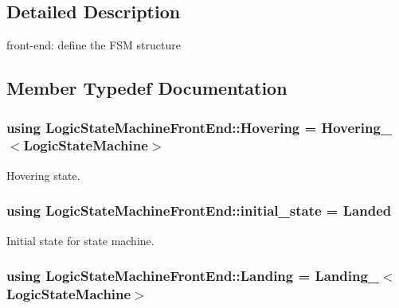 \subsection{Detailed Description}
front-\/end\-: define the F\-S\-M structure 

\subsection{Member Typedef Documentation}
\hypertarget{classLogicStateMachineFrontEnd_a5877b5b19ba413c2b3bb02ee2459d5ec}{
\subsubsection[{Hovering}]{\setlength{\rightskip}{0pt plus 5cm}using {\bf Logic\-State\-Machine\-Front\-End\-::\-Hovering} =  {\bf Hovering\-\_\-}$<${\bf Logic\-State\-Machine}$>$}}\label{classLogicStateMachineFrontEnd_a5877b5b19ba413c2b3bb02ee2459d5ec}


Hovering state. 

\hypertarget{classLogicStateMachineFrontEnd_ae617089cdb6687edc5d27b7f8a546af2}{
\subsubsection[{initial\-\_\-state}]{\setlength{\rightskip}{0pt plus 5cm}using {\bf Logic\-State\-Machine\-Front\-End\-::initial\-\_\-state} =  {\bf Landed}}}\label{classLogicStateMachineFrontEnd_ae617089cdb6687edc5d27b7f8a546af2}


Initial state for state machine. 

\hypertarget{classLogicStateMachineFrontEnd_acac7938fd313e8808e486fa884ccf49b}{
\subsubsection[{Landing}]{\setlength{\rightskip}{0pt plus 5cm}using {\bf Logic\-State\-Machine\-Front\-End\-::\-Landing} =  {\bf Landing\-\_\-}$<${\bf Logic\-State\-Machine}$>$}}\label{classLogicStateMachineFrontEnd_acac7938fd313e8808e486fa884ccf49b}


